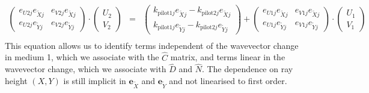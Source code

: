 \documentclass[12pt,a4paper,twoside,openright,BCOR10mm,headsepline,titlepage,abstracton,chapterprefix,final]{scrreprt}
\newcommand\Vector[1]{{\mathbf{#1}}}
\newcommand\wavenumber{k}
\newcommand\pilot{\textrm{pilot}}
\begin{document}
\begin{eqnarray}
 \begin{pmatrix}
  e_{U2j} e_{\tilde{X}j}  &  e_{V2j} e_{\tilde{X}j}
 \\
  e_{U2j} e_{\tilde{Y}j}  &  e_{V2j} e_{\tilde{Y}j}
 \end{pmatrix}
 \cdot
 \begin{pmatrix}  
   U_2 \\ V_2  
 \end{pmatrix}
 &=&
 \begin{pmatrix}
  \wavenumber_{\pilot 1 j} e_{\tilde{X}j} - \wavenumber_{\pilot 2 j} e_{\tilde{X}j} 
 \\
  \wavenumber_{\pilot 1 j} e_{\tilde{Y}j} - \wavenumber_{\pilot 2 j} e_{\tilde{Y}j}
 \end{pmatrix}
 + 
  \begin{pmatrix}
  e_{U1j} e_{\tilde{X}j}  &  e_{V1j} e_{\tilde{X}j}
 \\
  e_{U1j} e_{\tilde{Y}j}  &  e_{V1j} e_{\tilde{Y}j}
 \end{pmatrix}
 \cdot
 \begin{pmatrix}  
   U_1 \\ V_1  
 \end{pmatrix}
\nonumber\\\label{eq:xyuv_refraction_with_implicit_XY_dependence_in_tilde_base}
\end{eqnarray}
This equation allows us to identify terms independent of the wavevector change in medium 1, 
which we associate with the $\hat{C}$ matrix, and terms linear in the wavevector change,
which we associate with $\hat{D}$ and $\hat{N}$.
The dependence on ray height $(X,Y)$ is still implicit in $\Vector{e}_{\tilde{X}}$ and $\Vector{e}_{\tilde{Y}}$
and not linearised to first order.
\end{document}
